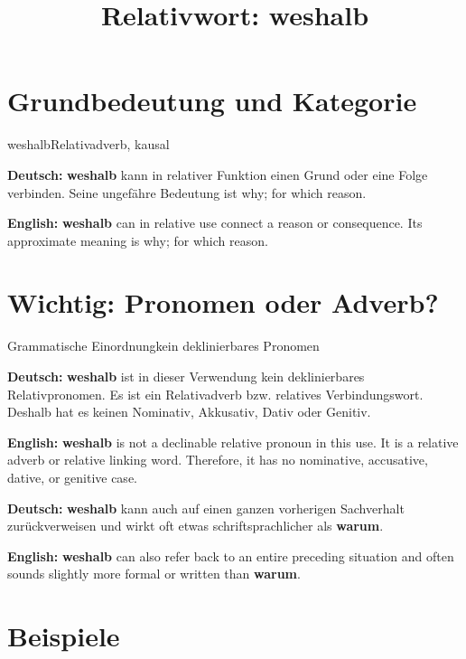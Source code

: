 \documentclass[a4paper,11pt]{article}
\title{Relativwort: \glqq weshalb\grqq{}}
\date{}
\newcommand{\GermanText}[1]{\textbf{Deutsch: }#1\par}
\newcommand{\EnglishText}[1]{{\small\color{SoftGray}\textbf{English: }#1\par}}
\begin{document}
\maketitle

\tableofcontents

\newpage

\section{Grundbedeutung und Kategorie}

\begin{grammarentry}{weshalb}{Relativadverb, kausal}

\GermanText{\textbf{weshalb} kann in relativer Funktion einen Grund oder eine Folge verbinden. Seine ungefähre Bedeutung ist \glqq why; for which reason\grqq{}.}

\EnglishText{\textbf{weshalb} can in relative use connect a reason or consequence. Its approximate meaning is \glqq why; for which reason\grqq{}.}

\end{grammarentry}

\section{Wichtig: Pronomen oder Adverb?}

\begin{grammarentry}{Grammatische Einordnung}{kein deklinierbares Pronomen}

\GermanText{\textbf{weshalb} ist in dieser Verwendung kein deklinierbares Relativpronomen. Es ist ein Relativadverb bzw. relatives Verbindungswort. Deshalb hat es keinen Nominativ, Akkusativ, Dativ oder Genitiv.}

\EnglishText{\textbf{weshalb} is not a declinable relative pronoun in this use. It is a relative adverb or relative linking word. Therefore, it has no nominative, accusative, dative, or genitive case.}

\GermanText{\textbf{weshalb} kann auch auf einen ganzen vorherigen Sachverhalt zurückverweisen und wirkt oft etwas schriftsprachlicher als \textbf{warum}.}

\EnglishText{\textbf{weshalb} can also refer back to an entire preceding situation and often sounds slightly more formal or written than \textbf{warum}.}

\end{grammarentry}

\section{Beispiele}
\end{document}
